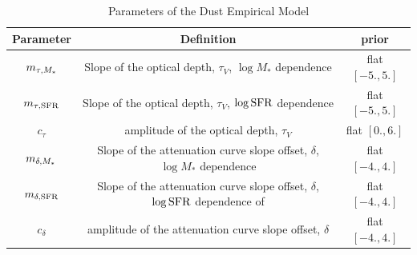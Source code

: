 \begin{table}
    \caption{Parameters of the Dust Empirical Model}
    \begin{center}
        \begin{tabular}{ccc} \toprule
            Parameter & Definition & prior\\[3pt] \hline\hline
            $m_{\tau,M_*}$ & Slope of the optical depth, $\tau_V$, $\log M_*$ dependence & flat $[-5., 5.]$\\
            $m_{\tau,{\rm SFR}}$ & Slope of the optical depth, $\tau_V$, $\log {\rm SFR}$ dependence & flat $[-5., 5.]$\\
            $c_{\tau}$ & amplitude of the optical depth, $\tau_V$ & flat $[0., 6.]$\\
            $m_{\delta,M_*}$ & Slope of the attenuation curve slope offset, $\delta$, $\log M_*$ dependence & flat $[-4., 4.]$\\
            $m_{\delta,{\rm SFR}}$ & Slope of the attenuation curve slope offset, $\delta$, $\log {\rm SFR}$ dependence of  & flat $[-4., 4.]$\\
            $c_{\delta}$ & amplitude of the attenuation curve slope offset, $\delta$ & flat $[-4., 4.]$\\
            \hline
        \end{tabular} \label{tab:free_param}
    \end{center}
\end{table}

